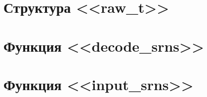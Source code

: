 \section{Структура <<raw\_t>>}
\label{cha:appendix3}


\newpage
\section{Функция <<decode\_srns>>}
\label{cha:appendix4}



\section{Функция <<input\_srns>>}
\label{cha:appendix5}


